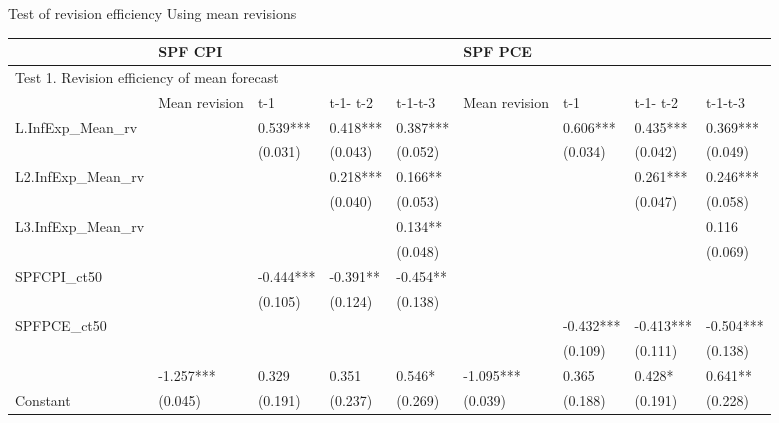\documentclass{beamer}
\begin{document}
\begin{frame}{Test of revision efficiency Using mean revisions}

	\begin{adjustbox}{width=0.9\textwidth}
	\begin{threeparttable}
		\label{MeanRevEfficiency}
		\begin{tabular}{lllllllll}
			\hline 
			& \multicolumn{4}{l}{SPF CPI}                     & \multicolumn{4}{l}{SPF PCE}                       \\
			\hline 
			\multicolumn{9}{l}{Test 1.  Revision efficiency of mean forecast}            \\
			\hline 
			& Mean revision & t-1       & t-1- t-2 & t-1-t-3  & Mean revision & t-1       & t-1- t-2  & t-1-t-3   \\
			\hline 
			L.InfExp\_Mean\_rv  &               & 0.539***  & 0.418*** & 0.387*** &               & 0.606***  & 0.435***  & 0.369***  \\
			&               & (0.031)   & (0.043)  & (0.052)  &               & (0.034)   & (0.042)   & (0.049)   \\
			L2.InfExp\_Mean\_rv &               &           & 0.218*** & 0.166**  &               &           & 0.261***  & 0.246***  \\
			&               &           & (0.040)  & (0.053)  &               &           & (0.047)   & (0.058)   \\
			L3.InfExp\_Mean\_rv &               &           &          & 0.134**  &               &           &           & 0.116     \\
			&               &           &          & (0.048)  &               &           &           & (0.069)   \\
			SPFCPI\_ct50        &               & -0.444*** & -0.391** & -0.454** &               &           &           &           \\
			&               & (0.105)   & (0.124)  & (0.138)  &               &           &           &           \\
			SPFPCE\_ct50        &               &           &          &          &               & -0.432*** & -0.413*** & -0.504*** \\
			&               &           &          &          &               & (0.109)   & (0.111)   & (0.138)   \\
			& -1.257***     & 0.329     & 0.351    & 0.546*   & -1.095***     & 0.365     & 0.428*    & 0.641**   \\
			Constant & (0.045)       & (0.191)   & (0.237)  & (0.269)  & (0.039)       & (0.188)   & (0.191)   & (0.228)   \\

\end{tabular}
\end{threeparttable}
\end{adjustbox}
\end{frame}
\end{document}
